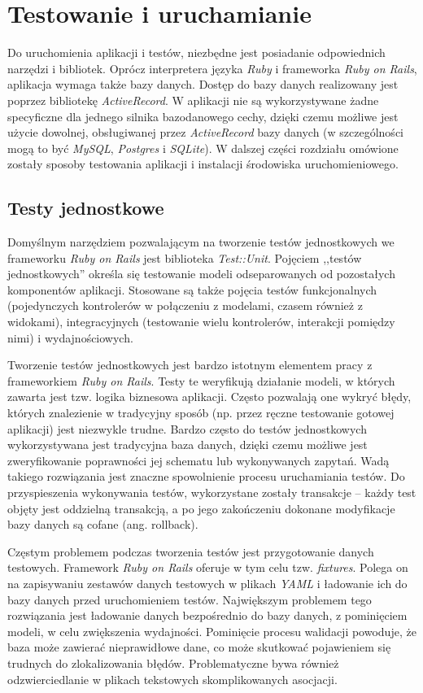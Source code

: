 \documentclass[11pt,twoside]{report}
\begin{document}
\cleardoublepage

\chapter{Testowanie i uruchamianie}
Do uruchomienia aplikacji i testów, niezbędne jest posiadanie
odpowiednich narzędzi i bibliotek. Oprócz interpretera języka
\emph{Ruby} i frameworka \emph{Ruby on Rails}, aplikacja wymaga także
bazy danych. Dostęp do bazy danych realizowany jest poprzez bibliotekę
\emph{ActiveRecord}. W aplikacji nie są wykorzystywane żadne
specyficzne dla jednego silnika bazodanowego cechy, dzięki czemu
możliwe jest użycie dowolnej, obsługiwanej przez \emph{ActiveRecord}
bazy danych (w szczególności mogą to być \emph{MySQL}, \emph{Postgres}
i \emph{SQLite}). W dalszej części rozdziału omówione zostały sposoby
testowania aplikacji i instalacji środowiska uruchomieniowego.

\section{Testy jednostkowe}
Domyślnym narzędziem pozwalającym na tworzenie testów jednostkowych we
frameworku \emph{Ruby on Rails} jest biblioteka
\emph{Test::Unit}. Pojęciem ,,testów jednostkowych'' określa się
testowanie modeli odseparowanych od pozostałych komponentów
aplikacji. Stosowane są także pojęcia testów funkcjonalnych
(pojedynczych kontrolerów w połączeniu z modelami, czasem również z
widokami), integracyjnych (testowanie wielu kontrolerów, interakcji
pomiędzy nimi) i wydajnościowych.

Tworzenie testów jednostkowych jest bardzo istotnym elementem pracy z
frameworkiem \emph{Ruby on Rails}. Testy te weryfikują działanie
modeli, w których zawarta jest tzw. logika biznesowa aplikacji. Często
pozwalają one wykryć błędy, których znalezienie w tradycyjny sposób
(np. przez ręczne testowanie gotowej aplikacji) jest niezwykle
trudne. Bardzo często do testów jednostkowych wykorzystywana jest
tradycyjna baza danych, dzięki czemu możliwe jest zweryfikowanie
poprawności jej schematu lub wykonywanych zapytań. Wadą takiego
rozwiązania jest znaczne spowolnienie procesu uruchamiania testów. Do
przyspieszenia wykonywania testów, wykorzystane zostały transakcje --
każdy test objęty jest oddzielną transakcją, a po jego zakończeniu
dokonane modyfikacje bazy danych są cofane (ang. rollback).

Częstym problemem podczas tworzenia testów jest przygotowanie danych
testowych. Framework \emph{Ruby on Rails} oferuje w tym celu
tzw. \emph{fixtures}. Polega on na zapisywaniu zestawów danych
testowych w plikach \emph{YAML} i ładowanie ich do bazy danych przed
uruchomieniem testów. Największym problemem tego rozwiązania jest
ładowanie danych bezpośrednio do bazy danych, z pominięciem modeli, w
celu zwiększenia wydajności. Pominięcie procesu walidacji powoduje, że
baza może zawierać nieprawidłowe dane, co może skutkować pojawieniem
się trudnych do zlokalizowania błędów. Problematyczne bywa również
odzwierciedlanie w plikach tekstowych skomplikowanych asocjacji.
\end{document}
